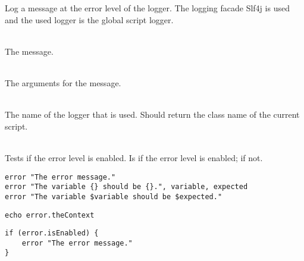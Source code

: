 %


Log a message at the error level of the logger.
The logging facade Slf4j\cite{slf4j13} is used and the used logger is
the global script logger.

\begin{asparadesc}
%
\item[\code{message}] \hfill \\
The message.
%
\item[\code{arguments...}] \hfill \\
The arguments for the message.
%
\item[\code{theContext}] \hfill \\
The name of the logger that is used. Should return the class name of the current
script.
%
\item[\code{isEnabled}] \hfill \\
Tests if the error level is enabled. Is  if the error level is enabled;
 if not.
%
\end{asparadesc}

\begin{lstlisting}[style=Groovybash, label={lst:example_error1}, title={%
Outputs a error logging message with arguments.}]
error "The error message."
error "The variable {} should be {}.", variable, expected
error "The variable $variable should be $expected."
\end{lstlisting}

\begin{lstlisting}[style=Groovybash, label={lst:example_error2}, title={%
Prints the name of the current logger.}]
echo error.theContext
\end{lstlisting}

\begin{lstlisting}[style=Groovybash, label={lst:example_error3}, title={%
Tests if the error level is enabled.}]
if (error.isEnabled) {
    error "The error message."
}
\end{lstlisting}

